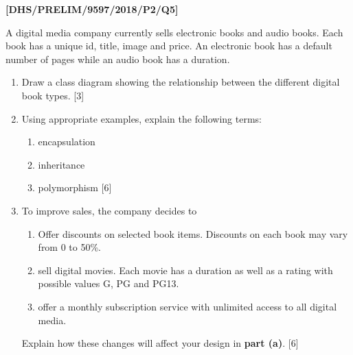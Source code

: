 \item \textbf{{[}DHS/PRELIM/9597/2018/P2/Q5{]} }

A digital media company currently sells electronic books and audio
books. Each book has a unique id, title, image and price. An electronic
book has a default number of pages while an audio book has a duration. 
\begin{enumerate}
\item Draw a class diagram showing the relationship between the different
digital book types. \hfill{}{[}3{]}
\item Using appropriate examples, explain the following terms:
\begin{enumerate}
\item encapsulation
\item inheritance
\item polymorphism\hfill{} {[}6{]}
\end{enumerate}
\item To improve sales, the company decides to
\begin{enumerate}
\item Offer discounts on selected book items. Discounts on each book may
vary from 0 to 50\%.
\item sell digital movies. Each movie has a duration as well as a rating
with possible values G, PG and PG13. 
\item offer a monthly subscription service with unlimited access to all
digital media.
\end{enumerate}
Explain how these changes will affect your design in \textbf{part
(a)}. \hfill{}{[}6{]}
\end{enumerate}